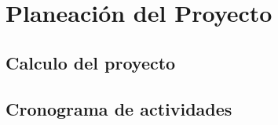 \section{Planeación del Proyecto}
    
    \subsection{Calculo del proyecto}
        
    \subsection{Cronograma de actividades}
        